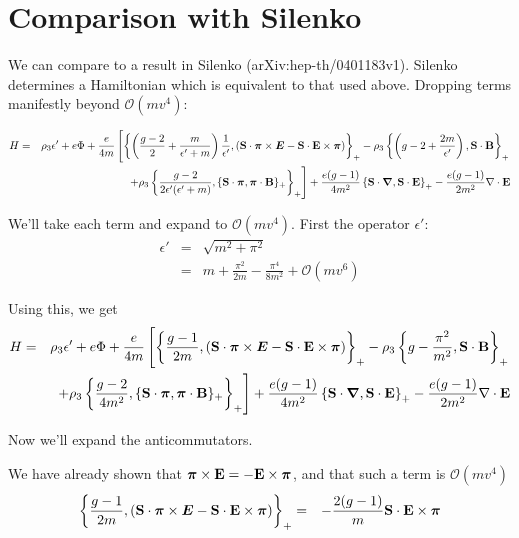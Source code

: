 

\section{Comparison with Silenko}

We can compare to a result in Silenko (arXiv:hep-th/0401183v1).  Silenko determines a Hamiltonian which is equivalent to that used above.  Dropping terms manifestly beyond $\mathcal{O}(mv^4)$:

\begin{eqnarray*}
H &=& \rho_3 \epsilon' + e\Phi +\frac{e}{4m} 
	\left [ \left \{ 	\left (\frac{g-2}{2} + \frac{m}{\epsilon' + m} \right )\frac{1}{\epsilon'}, 
				(\mathbf{S} \cdot \mbox{\boldmath$ \pi $} \times \mbox{\boldmath$ E $} - \mathbf{S} \cdot \mathbf{E} \times \mbox{\boldmath$ \pi $})
		\right \}_+
		- \rho_3 \left \{ \left ( g-2 + \frac{2m}{\epsilon'} \right ), \mathbf{S} \cdot \mathbf{B} \right \}_+
	\right.	\\
	&& \left.
		+\rho_3 \left \{ \frac{g-2}{2\epsilon' (\epsilon'+m)}, 
			\{\mathbf{S} \cdot \mbox{\boldmath$ \pi $}, \mbox{\boldmath$ \pi $} \cdot \mathbf{B} \}_+ \right \}_+
	\right ]
	+ \frac{e(g-1)}{4m^2}\left \{ \mathbf{S} \cdot \mbox{\boldmath$ \nabla $}, \mathbf{S} \cdot \mathbf{E} \right \}_+
	- \frac{e(g-1)}{2m^2} \mathbf{\nabla} \cdot \mathbf{E}
\end{eqnarray*}


We'll take each term and expand to $\mathcal{O}(mv^4)$. First the operator $\epsilon'$: 
\begin{eqnarray*}
\epsilon' 	
	&=& 	\sqrt{m^2 + \pi^2}						\\
	&=&	m + \frac{\pi^2}{2m} - \frac{\pi^4}{8m^2} +\mathcal{O}(mv^6)
\end{eqnarray*}

Using this, we get
\begin{eqnarray*}
H &=& \rho_3 \epsilon' + e\Phi +\frac{e}{4m} 
	\left [ \left \{ 	\frac{g-1}{2m}, 
				(\mathbf{S} \cdot \mbox{\boldmath$ \pi $} \times \mbox{\boldmath$ E $} - \mathbf{S} \cdot \mathbf{E} \times \mbox{\boldmath$ \pi $})
		\right \}_+
		- \rho_3 \left \{ g -\frac{\pi^2}{m^2} , \mathbf{S} \cdot \mathbf{B} \right \}_+
	\right.	\\
	&& \left.
		+\rho_3 \left \{ \frac{g-2}{4m^2}, 
			\{\mathbf{S} \cdot \mbox{\boldmath$ \pi $}, \mbox{\boldmath$ \pi $} \cdot \mathbf{B} \}_+ \right \}_+
	\right ]
	+ \frac{e(g-1)}{4m^2}\left \{ \mathbf{S} \cdot \mbox{\boldmath$ \nabla $}, \mathbf{S} \cdot \mathbf{E} \right \}_+
	- \frac{e(g-1)}{2m^2} \mathbf{\nabla} \cdot \mathbf{E}
\end{eqnarray*}

Now we'll expand the anticommutators.



We have already shown that $\mbox{\boldmath$ \pi $} \times \mathbf{E} = - \mathbf{E} \times \mbox{\boldmath$ \pi $}$, and that such a term is $\mathcal{O}(mv^4)$
\begin{eqnarray*}
\left \{ 	\frac{g-1}{2m}, 
				(\mathbf{S} \cdot \mbox{\boldmath$ \pi $} \times \mbox{\boldmath$ E $} - \mathbf{S} \cdot \mathbf{E} \times \mbox{\boldmath$ \pi $})
		\right \}_+
	&=&			-\frac{2(g-1)}{m} 	\mathbf{S} \cdot \mathbf{E} \times \mbox{\boldmath$ \pi $}
\end{eqnarray*}

